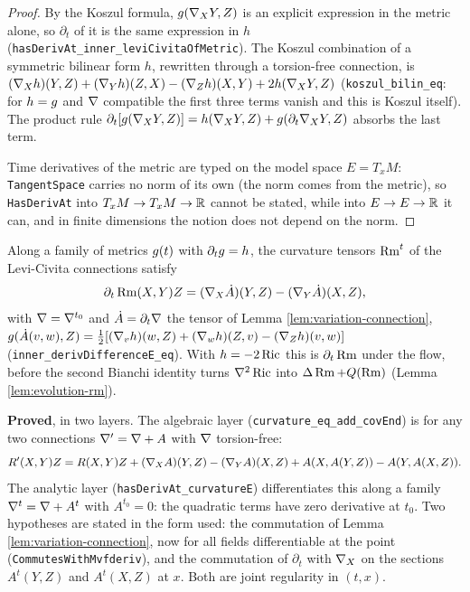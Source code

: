 \begin{proof}
  \leanok
  By the Koszul formula, $g(\nabla_X Y, Z)$ is an explicit expression in the
  metric alone, so $\partial_t$ of it is the same expression in $h$
  (\texttt{hasDerivAt\_inner\_leviCivitaOfMetric}). The Koszul combination of a
  symmetric bilinear form $h$, rewritten through a torsion-free connection, is
  $(\nabla_X h)(Y,Z) + (\nabla_Y h)(Z,X) - (\nabla_Z h)(X,Y) + 2h(\nabla_X Y, Z)$
  (\texttt{koszul\_bilin\_eq}: for $h = g$ and $\nabla$ compatible the first three
  terms vanish and this is Koszul itself). The product rule
  $\partial_t[g(\nabla_X Y, Z)] = h(\nabla_X Y, Z) + g(\partial_t \nabla_X Y, Z)$
  absorbs the last term.

  Time derivatives of the metric are typed on the model space $E = T_xM$:
  \texttt{TangentSpace} carries no norm of its own (the norm comes from the
  metric), so \texttt{HasDerivAt} into $T_xM \to T_xM \to \mathbb{R}$ cannot be stated,
  while into $E \to E \to \mathbb{R}$ it can, and in finite dimensions the notion does
  not depend on the norm.
\end{proof}

\begin{lemma}
  \label{lem:variation-curvature}
  \leanok
  Along a family of metrics $g(t)$ with $\partial_t g = h$, the curvature
  tensors $\operatorname{Rm}^t$ of the Levi-Civita connections satisfy
  \[
    \partial_t \operatorname{Rm}(X,Y)Z = (\nabla_X \dot A)(Y,Z) - (\nabla_Y \dot A)(X,Z),
  \]
  with $\nabla = \nabla^{t_0}$ and $\dot A = \partial_t \nabla$ the tensor of
  Lemma \ref{lem:variation-connection},
  $g(\dot A(v,w), Z) = \tfrac12[(\nabla_v h)(w,Z) + (\nabla_w h)(Z,v) - (\nabla_Z h)(v,w)]$
  (\texttt{inner\_derivDifferenceE\_eq}). With $h = -2\operatorname{Ric}$ this is
  $\partial_t \operatorname{Rm}$ under the flow, before the second Bianchi identity turns
  $\nabla^2 \operatorname{Ric}$ into $\Delta \operatorname{Rm} + Q(\operatorname{Rm})$ (Lemma \ref{lem:evolution-rm}).

  \textbf{Proved}, in two layers. The algebraic layer
  (\texttt{curvature\_eq\_add\_covEnd}) is for any two connections
  $\nabla' = \nabla + A$ with $\nabla$ torsion-free:
  \[
    R'(X,Y)Z = R(X,Y)Z + (\nabla_X A)(Y,Z) - (\nabla_Y A)(X,Z)
      + A(X, A(Y,Z)) - A(Y, A(X,Z)).
  \]
  The analytic layer (\texttt{hasDerivAt\_curvatureE}) differentiates this
  along a family $\nabla^t = \nabla + A^t$ with $A^{t_0} = 0$: the quadratic
  terms have zero derivative at $t_0$. Two hypotheses are stated in the form
  used: the commutation of Lemma \ref{lem:variation-connection}, now for all
  fields differentiable at the point (\texttt{CommutesWithMvfderiv}), and the
  commutation of $\partial_t$ with $\nabla_X$ on the sections $A^t(Y,Z)$ and
  $A^t(X,Z)$ at $x$. Both are joint regularity in $(t,x)$.
\end{lemma}

